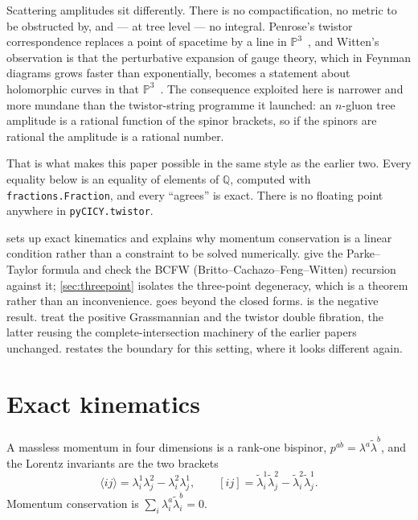 \documentclass[11pt,a4paper]{article}
\newcommand{\PP}{\mathbb{P}}
\newcommand{\QQ}{\mathbb{Q}}
\newcommand{\ket}[1]{\langle #1 \rangle}
\theoremstyle{definition}
\begin{document}
Scattering amplitudes sit differently. There is no compactification, no
metric to be obstructed by, and --- at tree level --- no integral. Penrose's
twistor correspondence replaces a point of spacetime by a line in
$\PP^3$~\cite{Penrose1967,Penrose1969}, and Witten's observation is that the
perturbative expansion of gauge theory, which in Feynman diagrams grows
faster than exponentially, becomes a statement about holomorphic curves in
that $\PP^3$~\cite{Witten2004}. The consequence exploited here is narrower and
more mundane than the twistor-string programme it launched: an $n$-gluon tree
amplitude is a rational function of the spinor brackets, so if the spinors are
rational the amplitude is a rational number.

That is what makes this paper possible in the same style as the earlier two.
Every equality below is an equality of elements of $\QQ$, computed with
\texttt{fractions.Fraction}, and every ``agrees'' is exact. There is no
floating point anywhere in \texttt{pyCICY.twistor}.

 sets up exact kinematics and explains why momentum
conservation is a linear condition rather than a constraint to be solved
numerically.  give the Parke--Taylor formula and check
the BCFW (Britto--Cachazo--Feng--Witten) recursion against it; \cref{sec:threepoint} isolates the three-point
degeneracy, which is a theorem rather than an inconvenience.
 goes beyond the closed forms.  is the
negative result.  treat the positive
Grassmannian and the twistor double fibration, the latter reusing the
complete-intersection machinery of the earlier papers unchanged.
 restates the boundary for this setting, where it looks
different again.


\section{Exact kinematics}
\label{sec:kinematics}

A massless momentum in four dimensions is a rank-one bispinor,
$p^{a\dot b} = \lambda^a \tilde\lambda^{\dot b}$, and the Lorentz invariants
are the two brackets
%
\begin{equation}
\ket{ij} = \lambda_i^1 \lambda_j^2 - \lambda_i^2 \lambda_j^1 ,
\qquad
[ij] = \tilde\lambda_i^1 \tilde\lambda_j^2
     - \tilde\lambda_i^2 \tilde\lambda_j^1 .
\label{eq:brackets}
\end{equation}
%
Momentum conservation is
$\sum_i \lambda_i^a \tilde\lambda_i^{\dot b} = 0$.
\end{document}
